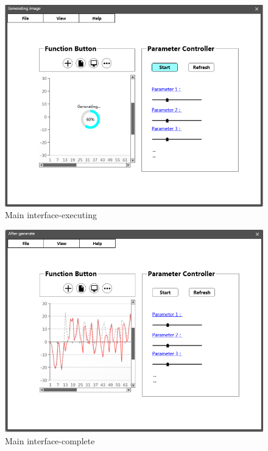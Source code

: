 \documentclass[11pt,oneside,a4paper]{article}
\begin{document}
\begin{enumerate}
  \begin{figure}[H]
    \begin{center}
    \includegraphics[height=0.3\textheight]{./source/Requirement/7.png}
    \caption{Main interface-executing}
    \label{}
    \end{center}
  \end{figure}

  \begin{figure}[H]
    \begin{center}
    \includegraphics[height=0.3\textheight]{./source/Requirement/8.png}
    \caption{Main interface-complete}
    \label{}
    \end{center}
  \end{figure}
\end{enumerate}
\end{document}
